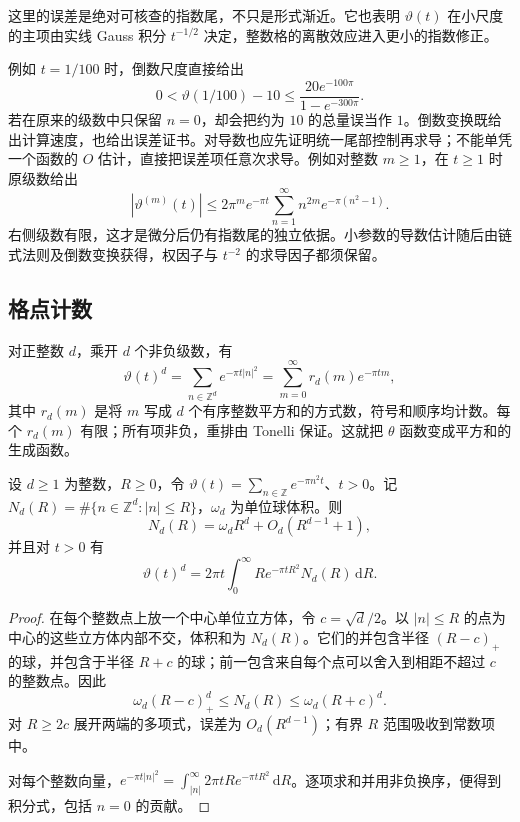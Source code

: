 这里的误差是绝对可核查的指数尾，不只是形式渐近。它也表明 \(\vartheta(t)\) 在小尺度的主项由实线 Gauss 积分 \(t^{-1/2}\) 决定，整数格的离散效应进入更小的指数修正。

\ProseParagraphBreak

例如 \(t=1/100\) 时，倒数尺度直接给出
\[
 0<\vartheta(1/100)-10
 \leq\frac{20e^{-100\pi}}{1-e^{-300\pi}}.
\]
若在原来的级数中只保留 \(n=0\)，却会把约为 \(10\) 的总量误当作 \(1\)。倒数变换既给出计算速度，也给出误差证书。对导数也应先证明统一尾部控制再求导；不能单凭一个函数的 \(O\) 估计，直接把误差项任意次求导。例如对整数 \(m\geq1\)，在 \(t\geq1\) 时原级数给出
\[
 |\vartheta^{(m)}(t)|
 \leq2\pi^m e^{-\pi t}\sum_{n=1}^\infty n^{2m}e^{-\pi(n^2-1)}.
\]
右侧级数有限，这才是微分后仍有指数尾的独立依据。小参数的导数估计随后由链式法则及倒数变换获得，权因子与 \(t^{-2}\) 的求导因子都须保留。

\subsection{格点计数}
\label{b2:subsec:060302}

对正整数 \(d\)，乘开 \(d\) 个非负级数，有
\[
 \vartheta(t)^d=\sum_{n\in\mathbb Z^d}e^{-\pi t|n|^2}
 =\sum_{m=0}^\infty r_d(m)e^{-\pi tm},
\]
其中 \(r_d(m)\) 是将 \(m\) 写成 \(d\) 个有序整数平方和的方式数，符号和顺序均计数。每个 \(r_d(m)\) 有限；所有项非负，重排由 Tonelli 保证。这就把 \(\theta\) 函数变成平方和的生成函数。

\begin{proposition}\label{b2:prop:06-lattice-counting}
设 \(d\geq1\) 为整数，\(R\geq0\)，令 \(\vartheta(t)=\sum_{n\in\mathbb Z}e^{-\pi n^2t}\)、\(t>0\)。记 \(N_d(R)=\#\{n\in\mathbb Z^d:|n|\leq R\}\)，\(\omega_d\) 为单位球体积。则
\[
 N_d(R)=\omega_dR^d+O_d(R^{d-1}+1),
\]
并且对 \(t>0\) 有
\[
 \vartheta(t)^d=2\pi t\int_0^\infty R e^{-\pi tR^2}N_d(R)\,\mathrm{d}R.
\]
\end{proposition}
\begin{proof}
在每个整数点上放一个中心单位立方体，令 \(c=\sqrt d/2\)。以 \(|n|\leq R\) 的点为中心的这些立方体内部不交，体积和为 \(N_d(R)\)。它们的并包含半径 \((R-c)_+\) 的球，并包含于半径 \(R+c\) 的球；前一包含来自每个点可以舍入到相距不超过 \(c\) 的整数点。因此
\[
 \omega_d(R-c)_+^d\leq N_d(R)\leq\omega_d(R+c)^d.
\]
对 \(R\geq2c\) 展开两端的多项式，误差为 \(O_d(R^{d-1})\)；有界 \(R\) 范围吸收到常数项中。

对每个整数向量，\(e^{-\pi t|n|^2}=\int_{|n|}^\infty2\pi tR e^{-\pi tR^2}\,\mathrm{d}R\)。逐项求和并用非负换序，便得到积分式，包括 \(n=0\) 的贡献。
\end{proof}

